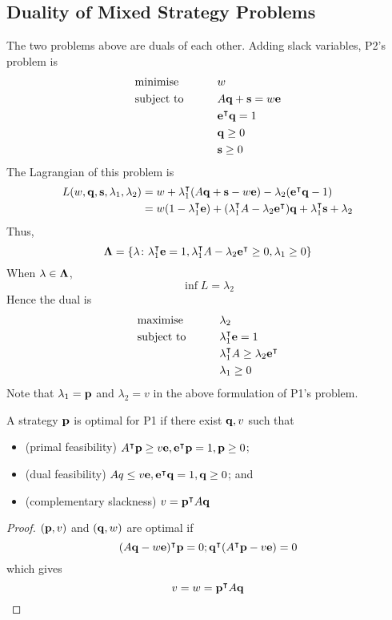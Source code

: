 \subsection{Duality of Mixed Strategy Problems}
The two problems above are duals of each other. Adding slack variables, P2's problem is
\begin{alignat*}{2}
    & \text{minimise} & \qquad & w            \\
    & \text{subject to}                                &        & A \vb q + \vb s = w \vb e \\
    & & & \vb e^\intercal \vb q = 1 \\
    & & & \vb q \geq 0 \\
    & & & \vb s \geq 0
\end{alignat*}
The Lagrangian of this problem is
\begin{align*}
        L(w, \vb q, \vb s, \vb\lambda_1, \lambda_2) &= w + \vb\lambda_1^\intercal (A\vb q + \vb s - w\vb e) - \lambda_2 (\vb e^\intercal \vb q - 1) \\
        &= w(1 - \vb\lambda_1^\intercal \vb e) + (\vb\lambda_1^\intercal A - \lambda_2 \vb e^\intercal) \vb q + \vb \lambda_1^\intercal\vb s + \lambda_2
\end{align*}
Thus,
\[ \vb\Lambda = \qty{\vb\lambda \colon \vb\lambda_1^\intercal\vb e = 1, \vb\lambda_1^\intercal A - \lambda_2\vb e^\intercal\geq 0, \vb \lambda_1 \geq 0} \]
When \( \vb\lambda \in \vb\Lambda \),
\[ \inf L = \lambda_2 \]
Hence the dual is
\begin{alignat*}{2}
    & \text{maximise} & \qquad & \lambda_2            \\
    & \text{subject to}                                &        & \vb\lambda_1^\intercal \vb e = 1 \\
    & & & \vb\lambda_1^\intercal A \geq \lambda_2 \vb e^\intercal \\
    & & & \vb \lambda_1 \geq 0
\end{alignat*}
Note that \( \vb \lambda_1 = \vb p \) and \( \lambda_2 = v \) in the above formulation of P1's problem.
\begin{theorem}
    A strategy \( \vb p \) is optimal for P1 if there exist \( \vb q, v \) such that
    \begin{itemize}
        \item (primal feasibility) \( A^\intercal \vb p \geq v \vb e, \vb e^\intercal \vb p = 1, \vb p \geq 0 \);
        \item (dual feasibility) \( Aq \leq v\vb e, \vb e^\intercal \vb q = 1, \vb q \geq 0 \); and
        \item (complementary slackness) \( v = \vb p^\intercal A \vb q \)
    \end{itemize}
\end{theorem}
\begin{proof}
    \( (\vb p, v) \) and \( (\vb q, w) \) are optimal if
    \[ (A \vb q - w \vb e)^\intercal \vb p = 0; \vb q^\intercal(A^\intercal \vb p - v \vb e) = 0 \]
    which gives
    \[ v = w = \vb p^\intercal A \vb q \]
\end{proof}

